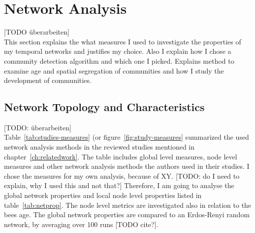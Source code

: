 \section{Network Analysis}
[TODO überarbeiten]\\
This section explains the what measures I used to investigate the properties of my temporal networks and justifies my choice. Also I explain how I chose a community detection algorithm and which one I picked. Explains method to examine age and spatial segregation of communities and how I study the development of communities.

\subsection{Network Topology and Characteristics}
\label{subsec:APmeasures}
[TODO: überarbeiten]\\
Table~\ref{tab:studies-measures} (or figure~\ref{fig:study-measures} summarized the used network analysis methods in the reviewed studies mentioned in chapter~\ref{ch:relatedwork}. The table includes global level measures, node level measures and other network analysis methods the authors used in their studies.
I chose the measures for my own analysis, because of XY.
[TODO: do I need to explain, why I used this and not that?]
Therefore, I am going to analyse the global network properties and local node level properties listed in table~\ref{tab:netprop}.
The node level metrics are investigated also in relation to the bees age.
The global network properties are compared to an Erdos-Renyi random network, by averaging over 100 runs [TODO cite?].\\




